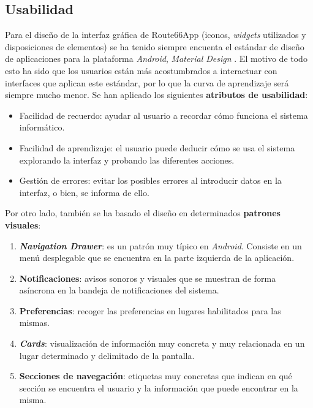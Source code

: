 \documentclass[twoside]{report}
\begin{document}

\subsection{Usabilidad}
\label{usabilitymatters}

Para el diseño de la interfaz gráfica de Route66App (iconos, \textit{widgets} utilizados y disposiciones de elementos) se ha tenido siempre encuenta el estándar de diseño de aplicaciones para la plataforma \textit{Android}, 	\textit{Material Design} \cite{materialil} \cite{materialdocs}. El motivo de todo esto ha sido que los usuarios están más acostumbrados a interactuar con interfaces que aplican este estándar, por lo que la curva de aprendizaje será siempre mucho menor. Se han aplicado los siguientes \textbf{atributos de usabilidad}:

\begin{itemize}
\item Facilidad de recuerdo: ayudar al usuario a recordar cómo funciona el sistema informático.
\item Facilidad de aprendizaje: el usuario puede deducir cómo se usa el sistema explorando la interfaz y probando las diferentes acciones.
\item Gestión de errores: evitar los posibles errores al introducir datos en la interfaz, o bien, se informa de ello.
\end{itemize}

Por otro lado, también se ha basado el diseño en determinados \textbf{patrones visuales}:
\begin{enumerate}
	\item \textbf{\textit{Navigation Drawer}}: es un patrón muy típico en \textit{Android}. Consiste en un menú desplegable que se encuentra en la parte izquierda de la aplicación.
	\item \textbf{Notificaciones}: avisos sonoros y visuales que se muestran de forma asíncrona en la bandeja de notificaciones del sistema.
	\item \textbf{Preferencias}: recoger las preferencias en lugares habilitados para las mismas.
	\item \textbf{\textit{Cards}}: visualización de información muy concreta y muy relacionada en un lugar determinado y delimitado de la pantalla.
	\item \textbf{Secciones de navegación}: etiquetas muy concretas que indican en qué sección se encuentra el usuario y la información que puede encontrar en la misma.
\end{enumerate}
\end{document}
